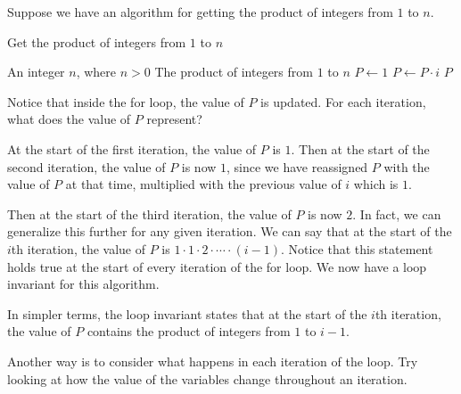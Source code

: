 \begin{example}
    Suppose we have an algorithm for getting the product of integers from $1$ to $n$.
    \begin{algorithm}[H]
        \caption{Get the product of integers from $1$ to $n$ }
        \begin{algorithmic}[1]
            \Require An integer $n$, where $n>0$ 
            \Ensure The product of integers from $1$ to $n$ 
            \State $P \gets 1$
            \State $P \gets P \cdot i$ 
            \EndFor
            \Return $P$
            \EndFunction
        \end{algorithmic}
    \end{algorithm}

    Notice that inside the for loop, the value of $P$ is updated. For each iteration, what does the value of $P$ represent? 

    At the start of the first iteration, the value of $P$ is $1$. Then at the start of the second iteration, the value of $P$ is now $1$, since we have reassigned $P$ with the value of $P$ at that time, multiplied with the previous value of $i$ which is $1$. 

    Then at the start of the third iteration, the value of $P$ is now $2$. In fact, we can generalize this further for any given iteration. We can say that at the start of the $i$th iteration, the value of $P$ is $1 \cdot 1 \cdot 2 \cdot \cdots \cdot (i-1)$. Notice that this statement holds true at the start of every iteration of the for loop. We now have a loop invariant for this algorithm.

    In simpler terms, the loop invariant states that at the start of the $i$th iteration, the value of $P$ contains the product of integers from $1$ to $i-1$.
\end{example}

Another way is to consider what happens in each iteration of the loop. Try looking at how the value of the variables change throughout an iteration.


